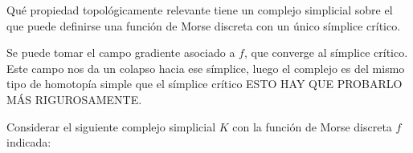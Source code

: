 \documentclass[twoside]{article}
\begin{document}
\newpage

\begin{ejercicio}{4}
Qué propiedad topológicamente relevante tiene un complejo simplicial sobre el que puede definirse una función de Morse discreta con un único símplice crítico.
\end{ejercicio}
\begin{solucion}
Se puede tomar el campo gradiente asociado a $f$, que converge al símplice crítico. Este campo nos da un colapso hacia ese símplice, luego el complejo es del mismo tipo de homotopía simple que el símplice crítico ESTO HAY QUE PROBARLO MÁS RIGUROSAMENTE.
\end{solucion}

\newpage

\begin{ejercicio}{5}
Considerar el siguiente complejo simplicial $K$ con la función de Morse discreta $f$ indicada:


\end{ejercicio}
\end{document}
